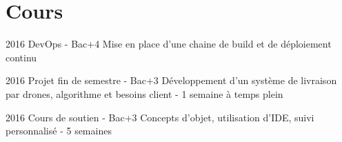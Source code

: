 \section{Cours}

\begin{yearlist}

\item{2016}
     {DevOps - Bac+4}
     {Mise en place d'une chaine de build et de d\'eploiement continu}

\item{2016}
     {Projet fin de semestre - Bac+3}
     {D\'eveloppement d'un syst\`eme de livraison par drones, algorithme et besoins client - 1 semaine \`a temps plein}

\item{2016}
     {Cours de soutien  - Bac+3}
     {Concepts d'objet, utilisation d'IDE, suivi personnalis\'e - 5 semaines}

\end{yearlist}